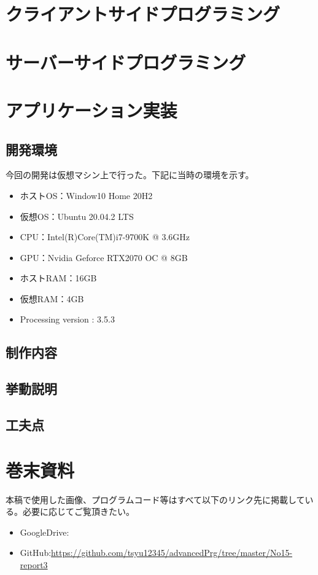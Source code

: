 \documentclass[dvipdfmx]{jsarticle}
\begin{document}
\section{クライアントサイドプログラミング}
\section{サーバーサイドプログラミング}
\section{アプリケーション実装}
\subsection{開発環境}
今回の開発は仮想マシン上で行った。下記に当時の環境を示す。
\begin{itemize}
  \item ホストOS：Window10 Home 20H2
  \item 仮想OS：Ubuntu 20.04.2 LTS
  \item CPU：Intel(R)Core(TM)i7-9700K @ 3.6GHz
  \item GPU：Nvidia Geforce RTX2070 OC @ 8GB
  \item ホストRAM：16GB
  \item 仮想RAM：4GB
  \item Processing version : 3.5.3
\end{itemize}
\subsection{制作内容}
\subsection{挙動説明}
\subsection{工夫点}
\section{巻末資料}
本稿で使用した画像、プログラムコード等はすべて以下のリンク先に掲載している。必要に応じてご覧頂きたい。
\begin{itemize}
  \item GoogleDrive:\url{}
  \item GitHub:\url{https://github.com/tsyu12345/advancedPrg/tree/master/No15-report3}
\end{itemize}
\end{document}
